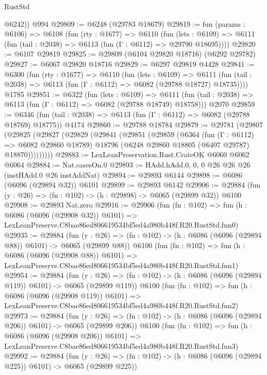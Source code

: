 \begin{lexlean}{RustStd}
\begin{coremodule}
        @6242))
    @994
@29809 := @6248 (@29783 @18679)
@29819 := fun (params : @6106) =>
  @6108
    (fun (rty : @1677) =>
    @6110
      (fun (lets : @6109) =>
      @6111 (fun (tail : @2038) => @6113 (fun (Γ : @6112) => @29790 @18695))))
@29820 := @6107 @29819
@29825 := @29809 (@6104 @29820 @18716) (@6292 @29782)
@29827 := @6067 @29820 @18716
@29829 := @6297 @29819 @4428
@29841 := @6300
    (fun (rty : @1677) =>
    @6110
      (fun (lets : @6109) =>
      @6111 (fun (tail : @2038) => @6113 (fun (Γ : @6112) => @6082 (@29788 @18727) @18735))))
    @1785
@29851 := @6322
    (fun (lets : @6109) =>
    @6111 (fun (tail : @2038) => @6113 (fun (Γ : @6112) => @6082 (@29788 @18749) @18758)))
    @2070
@29859 := @6346
    (fun (tail : @2038) => @6113 (fun (Γ : @6112) => @6082 (@29788 @18769) @18775))
    @4174
@29860 := @29788 @18784
@29879 := @29781
    (@29807
      (@29825
        (@29827
          (@29829
            (@29841
              (@29851
                (@29859
                  (@6364
                    (fun (Γ : @6112) => @6082 @29860 @18789)
                    @18796
                    (@6248 @29860 @18805 (@6407 @29787) @18870)))))))))
@29883 := LexLeanPreservation.Rust.CrateOK @6060 @6062 @6064
@29884 := Nat.casesOn.{0}
@29893 := HAdd.hAdd.{0, 0, 0} @26 @26 @26 (instHAdd.{0} @26 instAddNat)
@29894 := @29893 @6144
@29898 := @6086 (@6096 (@29894 @32)) @6101
@29899 := @29893 @6142
@29906 := @29884 (fun (y : @26) => (fn : @102) -> (h : @29898) -> @6065 (@29899 @32)) @6100
@29908 := @29893 Nat.zero
@29916 := @29906
    (fun (fn : @102) =>
    fun (h : @6086 (@6096 (@29908 @32)) @6101) =>
    LexLeanPreserve.C8bae86ed806619534bf5ed4a980b448f.R20.RustStd.fun0)
@29935 := @29884
    (fun (y : @26) => (fn : @102) -> (h : @6086 (@6096 (@29894 @88)) @6101) -> @6065 (@29899 @88))
    @6100
    (fun (fn : @102) =>
    fun (h : @6086 (@6096 (@29908 @88)) @6101) =>
    LexLeanPreserve.C8bae86ed806619534bf5ed4a980b448f.R20.RustStd.fun1)
@29954 := @29884
    (fun (y : @26) => (fn : @102) -> (h : @6086 (@6096 (@29894 @119)) @6101) -> @6065 (@29899 @119))
    @6100
    (fun (fn : @102) =>
    fun (h : @6086 (@6096 (@29908 @119)) @6101) =>
    LexLeanPreserve.C8bae86ed806619534bf5ed4a980b448f.R20.RustStd.fun2)
@29973 := @29884
    (fun (y : @26) => (fn : @102) -> (h : @6086 (@6096 (@29894 @206)) @6101) -> @6065 (@29899 @206))
    @6100
    (fun (fn : @102) =>
    fun (h : @6086 (@6096 (@29908 @206)) @6101) =>
    LexLeanPreserve.C8bae86ed806619534bf5ed4a980b448f.R20.RustStd.fun3)
@29992 := @29884
    (fun (y : @26) => (fn : @102) -> (h : @6086 (@6096 (@29894 @225)) @6101) -> @6065 (@29899 @225))

\end{coremodule}
\end{lexlean}
